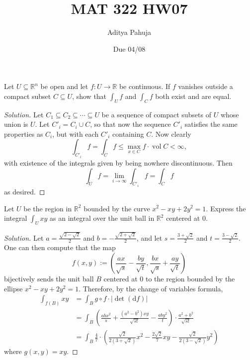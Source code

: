 \documentclass[10pt]{scrartcl}
\title{\vspace{-2em}MAT 322 HW07}
\author{\large Aditya Pahuja}
\date{\large Due 04/08}
\providecommand{\RR}{\mathbb R}
\newenvironment{soln}{\begin{proof}[Solution]}{\end{proof}}
\begin{document}
\maketitle

\begin{problem}
	Let $U\subseteq\RR^n$ be open and let $f\colon U\to\RR$ be continuous.
	If $f$ vanishes outside a compact subset $C\subseteq U$,
	show that $\int_Uf$ and $\int_Cf$ both exist and are equal.
\end{problem}

\begin{soln}
	Let $C_1\subseteq C_2\subseteq\cdots\subseteq U$ be a sequence
	of compact subsets of $U$ whose union is $U$.
	Let $C'_i = C_i\cup C$, so that now the sequence $C'_i$
	satisfies the same properties as $C_i$, but with each $C'_i$ containing $C$.
	Now clearly
	\[\int_{C'_i}f = \int_Cf \le \max_{x\in C}f \cdot\operatorname{vol}C
	< \infty,\]
	with existence of the integrals given by being nowhere discontinuous. Then
	\[\int_Uf = \lim_{i\to\infty}\int_{C'_i}f = \int_Cf\]
	as desired.
\end{soln}

\begin{problem}
	Let $U$ be the region in $\RR^2$ bounded by the curve $x^2-xy+2y^2=1$.
	Express the integral $\int_Uxy$ as an integral
	over the unit ball in $\RR^2$ centered at $0$.
\end{problem}

\begin{soln}
	Let $a = \frac{\sqrt{2-\sqrt2}}{2}$
	and $b = -\frac{\sqrt{2+\sqrt2}}{2}$,
	and let $s = \frac{3+\sqrt2}{2}$ and $t = \frac{3-\sqrt2}{2}$.
	One can then compute that the map
	\[f(x,y) := \left(\frac{ax}{\sqrt s} - \frac{by}{\sqrt t},
	\frac{bx}{\sqrt s} + \frac{ay}{\sqrt t}\right)\]
	bijectively sends the unit ball $B$ centered at $0$ to the region bounded by
	the ellipse $x^2-xy+2y^2=1$. Therefore, by the change of variables formula,
	\begin{align*}
		\int_{f(B)} xy &= \int_{B} g\circ f\cdot |\det(\mathrm df)|\\
		&= \int_B \left(\frac{abx^2}{s} + \frac{(a^2-b^2)xy}{\sqrt{st}}
		- \frac{aby^2}{t}\right)\cdot\frac{a^2+b^2}{\sqrt{st}}\\
		&= \int_B \frac{4}{7}\cdot\left(\frac{\sqrt2}{2(3+\sqrt2)}x^2
		- \frac{2\sqrt2}{7}xy-\frac{\sqrt2}{2(3-\sqrt2)}y^2\right)
	\end{align*}
	where $g(x,y) = xy$.
\end{soln}
\end{document}

